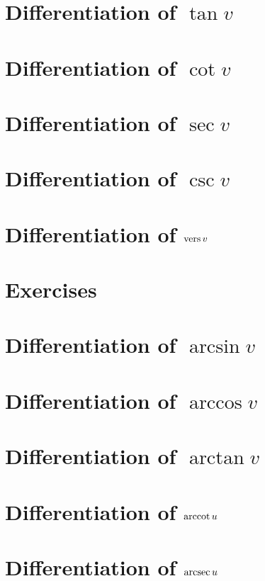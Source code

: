\section{Differentiation of $\tan v$}
\label{sec:05:20}

\section{Differentiation of $\cot v$}
\label{sec:05:21}

\section{Differentiation of $\sec v$}
\label{sec:05:22}

\section{Differentiation of $\csc v$}
\label{sec:05:23}

\section{Differentiation of $\operatorname{vers} v$}
\label{sec:05:24}

\section{Exercises}
\label{sec:05:25}

\section{Differentiation of $\arcsin v$}
\label{sec:05:26}

\section{Differentiation of $\arccos v$}
\label{sec:05:27}

\section{Differentiation of $\arctan v$}
\label{sec:05:28}

\section{Differentiation of $\operatorname{arccot} u$}
\label{sec:05:29}

\section{Differentiation of $\operatorname{arcsec} u$}
\label{sec:05:30}

